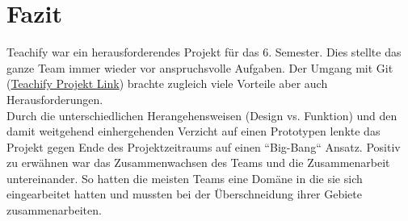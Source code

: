 \section{Fazit}
Teachify war ein herausforderendes Projekt für das 6. Semester. Dies stellte das ganze Team immer wieder vor anspruchsvolle Aufgaben. Der Umgang mit Git (\href{https://github.com/cpfeiffer3008/Teachify}{Teachify Projekt Link}) brachte zugleich viele Vorteile aber auch Herausforderungen.\\
Durch die unterschiedlichen Herangehensweisen (Design vs. Funktion) und den damit weitgehend einhergehenden Verzicht auf einen Prototypen lenkte das Projekt gegen Ende des Projektzeitraums auf einen ``Big-Bang`` Ansatz.
Positiv zu erwähnen war das Zusammenwachsen des Teams und die Zusammenarbeit untereinander. So hatten die meisten Teams eine Domäne in die sie sich eingearbeitet hatten und mussten bei der Überschneidung ihrer Gebiete zusammenarbeiten.
